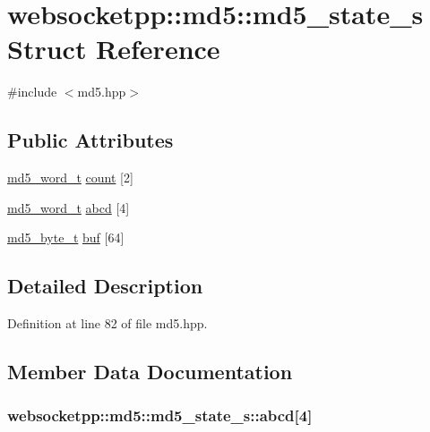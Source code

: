 \hypertarget{structwebsocketpp_1_1md5_1_1md5__state__s}{}\section{websocketpp\+:\+:md5\+:\+:md5\+\_\+state\+\_\+s Struct Reference}
\label{structwebsocketpp_1_1md5_1_1md5__state__s}


{\ttfamily \#include $<$md5.\+hpp$>$}

\subsection*{Public Attributes}
\begin{DoxyCompactItemize}
\item 
\hyperlink{namespacewebsocketpp_1_1md5_a0ece422ac11bb1332dcf342ced42ac96}{md5\+\_\+word\+\_\+t} \hyperlink{structwebsocketpp_1_1md5_1_1md5__state__s_a749f80b1f08f2e740e63a05a8821cf5c}{count} \mbox{[}2\mbox{]}
\item 
\hyperlink{namespacewebsocketpp_1_1md5_a0ece422ac11bb1332dcf342ced42ac96}{md5\+\_\+word\+\_\+t} \hyperlink{structwebsocketpp_1_1md5_1_1md5__state__s_a4579438de233e09db1f5994a341a3371}{abcd} \mbox{[}4\mbox{]}
\item 
\hyperlink{namespacewebsocketpp_1_1md5_a0c434041715d244182207c3413e36e71}{md5\+\_\+byte\+\_\+t} \hyperlink{structwebsocketpp_1_1md5_1_1md5__state__s_a4d3bae1432efcd8e294b910ee01ef39a}{buf} \mbox{[}64\mbox{]}
\end{DoxyCompactItemize}


\subsection{Detailed Description}


Definition at line 82 of file md5.\+hpp.



\subsection{Member Data Documentation}
\hypertarget{structwebsocketpp_1_1md5_1_1md5__state__s_a4579438de233e09db1f5994a341a3371}{}
\subsubsection[{abcd}]{ websocketpp\+::md5\+::md5\+\_\+state\+\_\+s\+::abcd\mbox{[}4\mbox{]}}\label{structwebsocketpp_1_1md5_1_1md5__state__s_a4579438de233e09db1f5994a341a3371}


